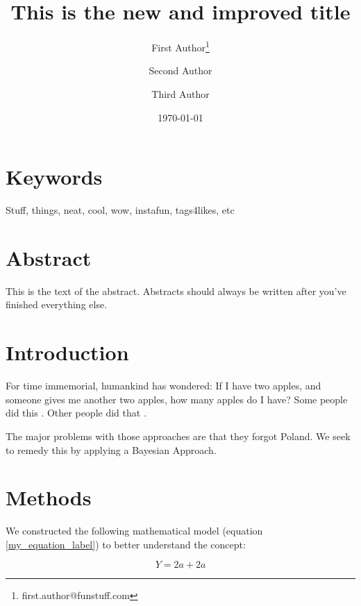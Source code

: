 \documentclass[11pt,letterpaper]{article} %
\date{\today}
\title{This is the new and improved title}
\author[1]{First Author\thanks{first.author@funstuff.com}}
\author[1,2]{Second Author}
\author[2]{Third Author}
\affil[1]{Department of Computer Science, \LaTeX\ University}
\affil[2]{Department of Mechanical Engineering, Superfabulous University}
\begin{document}
\maketitle


\section*{Keywords}
Stuff, things, neat, cool, wow, instafun, tags4likes, etc

\linenumbers %
\def\linenumberfont{\normalfont\small\rmfamily} %

\section*{Abstract}
This is the text of the abstract.
Abstracts should always be written after you've finished everything else.

\section*{Introduction}
For time immemorial, humankind has wondered: If I have two apples, and someone gives me another two apples, how many apples do I have? Some people did this \citep{Darwin1859}. Other people did that \citep{Wallace1869}.

The major problems with those approaches are that they forgot Poland.
We seek to remedy this by applying a Bayesian Approach.

\section*{Methods}
We constructed the following mathematical model (equation \ref{my_equation_label}) to better understand the concept:

\begin{equation}\label{my_equation_label}
	Y = 2a + 2a
\end{equation}
\end{document}
